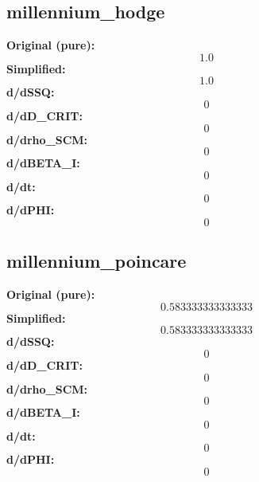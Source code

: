 \subsection{millennium_hodge}
\textbf{Original (pure):}
\begin{equation}
1.0
\end{equation}
\textbf{Simplified:}
\begin{equation}
1.0
\end{equation}
\textbf{d/dSSQ:}
\begin{equation}
0
\end{equation}
\textbf{d/dD_CRIT:}
\begin{equation}
0
\end{equation}
\textbf{d/drho_SCM:}
\begin{equation}
0
\end{equation}
\textbf{d/dBETA_I:}
\begin{equation}
0
\end{equation}
\textbf{d/dt:}
\begin{equation}
0
\end{equation}
\textbf{d/dPHI:}
\begin{equation}
0
\end{equation}

\subsection{millennium_poincare}
\textbf{Original (pure):}
\begin{equation}
0.583333333333333
\end{equation}
\textbf{Simplified:}
\begin{equation}
0.583333333333333
\end{equation}
\textbf{d/dSSQ:}
\begin{equation}
0
\end{equation}
\textbf{d/dD_CRIT:}
\begin{equation}
0
\end{equation}
\textbf{d/drho_SCM:}
\begin{equation}
0
\end{equation}
\textbf{d/dBETA_I:}
\begin{equation}
0
\end{equation}
\textbf{d/dt:}
\begin{equation}
0
\end{equation}
\textbf{d/dPHI:}
\begin{equation}
0
\end{equation}

